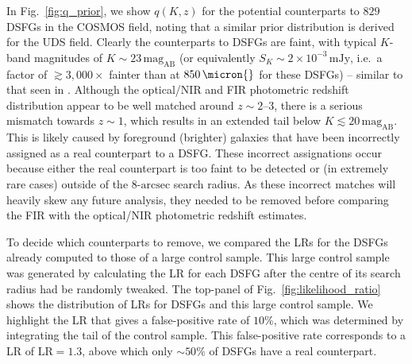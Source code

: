 \documentclass[a4paper, fleqn, usenatbib]{mnras}
\newcommand{\magab}{\text{mag}_{\text{AB}}}
\newcommand{\millijanksy}{\text{mJy}}
\begin{document}
In Fig.~\ref{fig:q_prior}, we show $q(K,z)$ for the potential counterparts to $829$ DSFGs in the COSMOS field, noting that a similar prior distribution is derived for the UDS field.
Clearly the counterparts to DSFGs are faint, with typical $K$-band magnitudes of $K\sim23\,\magab{}$ (or equivalently $S_{K}\sim2\times10^{-3}\,\millijanksy{}$, i.e.\ a factor of $\gtrsim3{,}000\times$ fainter than at $850\,\micron{}$ for these DSFGs) -- similar to that seen in \citet{simpson14}.
Although the optical/NIR and FIR photometric redshift distribution appear to be well matched around $z\sim2\text{--}3$, there is a serious mismatch towards $z\sim1$, which results in an extended tail below $K\lesssim20\,\magab{}$.
This is likely caused by foreground (brighter) galaxies that have been incorrectly assigned as a real counterpart to a DSFG.
These incorrect assignations occur because either the real counterpart is too faint to be detected or (in extremely rare cases) outside of the $8\text{-}\text{arcsec}$ search radius.
As these incorrect matches will heavily skew any future analysis, they needed to be removed before comparing the FIR with the optical/NIR photometric redshift estimates.

To decide which counterparts to remove, we compared the LRs for the DSFGs already computed to those of a large control sample.
This large control sample was generated by calculating the LR for each DSFG after the centre of its search radius had be randomly tweaked.
The top-panel of Fig.~\ref{fig:likelihood_ratio} shows the distribution of LRs for DSFGs and this large control sample.
We highlight the LR that gives a false-positive rate of $10\%$, which was determined by integrating the tail of the control sample.
This false-positive rate corresponds to a LR of $\text{LR}=1.3$, above which only $\sim50\%$ of DSFGs have a real counterpart.
\end{document}
